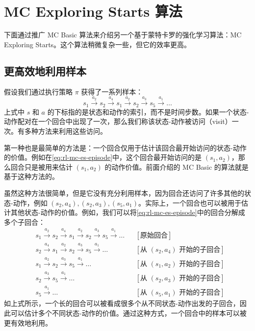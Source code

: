 \section{MC Exploring Starts 算法}
\label{sec:rl-mc-es}

下面通过推广 MC Basic 算法来介绍另一个基于蒙特卡罗的强化学习算法：MC Exploring Starts。这个算法稍微复杂一些，但它的效率更高。

\subsection{更高效地利用样本}
\label{sec:rl-mc-es-sample}

假设我们通过执行策略 $\pi$ 获得了一系列样本：
\begin{equation}
\label{eq:rl-mc-es-episode}
s_{1} \xrightarrow{a_{2}} s_{2} \xrightarrow{a_{4}} s_{1} \xrightarrow{a_{2}} s_{2} \xrightarrow{a_{3}} s_{5} \xrightarrow{a_{1}} \dots
\end{equation}
上式中 $s$ 和 $a$ 的下标指的是状态和动作的索引，而不是时间步数。如果一个状态-动作配对在一个回合中出现了一次，那么我们称该状态-动作被访问（visit）一次。有多种方法来利用这些访问。

第一种也是最简单的方法是：一个回合仅用于估计该回合最开始访问的状态-动作的价值。例如在\cref{eq:rl-mc-es-episode}中，这个回合最开始访问的是 $(s_1, a_2)$，那么回合只是被用来估计 $(s_1, a_2)$ 的动作价值。前面介绍的 MC Basic 的算法就是基于这种方法的。

虽然这种方法很简单，但是它没有充分利用样本，因为回合还访问了许多其他的状态-动作，例如 $(s_2, a_4), (s_2, a_3), (s_5, a_1)$。实际上，一个回合也可以被用于估计其他状态-动作的价值。例如，我们可以将\cref{eq:rl-mc-es-episode}中的回合分解成多个子回合：
\begin{equation}
\begin{aligned}
&s_{1} \xrightarrow{a_{2}} s_{2} \xrightarrow{a_{4}} s_{1} \xrightarrow{a_{2}} s_{2} \xrightarrow{a_{3}} s_{5} \xrightarrow{a_{1}} \dots && [\text{原始回合}] \\
&s_{2} \xrightarrow{a_{4}} s_{1} \xrightarrow{a_{2}} s_{2} \xrightarrow{a_{3}} s_{5} \xrightarrow{a_{1}} \dots && [\text{从 } (s_{2}, a_{4}) \text{ 开始的子回合}] \\
&s_{1} \xrightarrow{a_{2}} s_{2} \xrightarrow{a_{3}} s_{5} \xrightarrow{a_{1}} \dots && [\text{从 } (s_{1}, a_{2}) \text{ 开始的子回合}] \\
&s_{2} \xrightarrow{a_{3}} s_{5} \xrightarrow{a_{1}} \dots && [\text{从 } (s_{2}, a_{3}) \text{ 开始的子回合}] \\
&s_{5} \xrightarrow{a_{1}} \dots && [\text{从 } (s_{5}, a_{1}) \text{ 开始的子回合}]
\end{aligned}
\end{equation}
如上式所示，一个长的回合可以被看成很多个从不同状态-动作出发的子回合，因此可以估计多个不同状态-动作的价值。通过这种方式，一个回合中的样本可以被更有效地利用。

